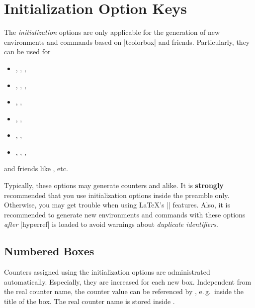 \clearpage
\section{Initialization Option Keys}\label{sec:initkeys}%
%
The \emph{initialization} options are only applicable for the generation
of new environments and commands based on |tcolorbox| and friends.
Particularly, they can be used for
\begin{itemize}
\item{}, , ,
\item{}, , ,
\item{}, ,
\item{}, ,
\item{}, ,
\item{}, , ,
\end{itemize}
and friends like , etc.

\bigskip
\begin{marker}
Typically, these options may generate counters and alike.
It is \textbf{strongly} recommended that you use initialization options inside
the preamble only. Otherwise, you may get trouble when using \LaTeX's || features.
Also, it is recommended to generate new environments and commands with these
options \emph{after} |hyperref| is loaded to avoid warnings about
\emph{duplicate identifiers}.
\end{marker}


\subsection{Numbered Boxes}\label{sec:numberedboxes}
Counters assigned using the initialization options are administrated
automatically. Especially, they are increased for each new box.
Independent from the real counter name, the counter value can be
referenced by , e.\,g.\ inside the title of
the box. The real counter name is stored inside .

